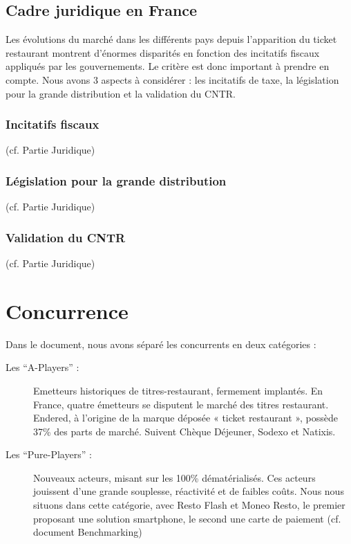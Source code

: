 \subsection{Cadre juridique en France}
Les évolutions du marché dans les différents pays depuis l’apparition du ticket
restaurant montrent d’énormes disparités en fonction des incitatifs fiscaux
appliqués par les gouvernements. Le critère est donc important à prendre en
compte. Nous avons 3 aspects à considérer : les incitatifs de taxe, la
législation pour la grande distribution et la validation du CNTR. \\

\subsubsection{Incitatifs fiscaux}
(cf. Partie Juridique)

\subsubsection{Législation pour la grande distribution}
(cf. Partie Juridique)

\subsubsection{Validation du CNTR}
(cf. Partie Juridique)

\section{Concurrence}

Dans le document, nous avons séparé les concurrents en deux catégories : \\

\begin{description}
\item[Les “A-Players” :] Emetteurs historiques de titres-restaurant, fermement
  implantés. En France, quatre émetteurs se disputent le marché des titres
  restaurant. Endered, à l’origine de la marque déposée « ticket restaurant »,
  possède 37\% des parts de marché. Suivent Chèque Déjeuner, Sodexo et Natixis.
\item[Les “Pure-Players” :] Nouveaux acteurs, misant sur les 100\%
  dématérialisés. Ces acteurs jouissent d’une grande souplesse, réactivité et de
  faibles coûts. Nous nous situons dans cette catégorie, avec Resto Flash et
  Moneo Resto, le premier proposant une solution smartphone, le second une carte
  de paiement (cf. document Benchmarking)
\end{description}
~\\

